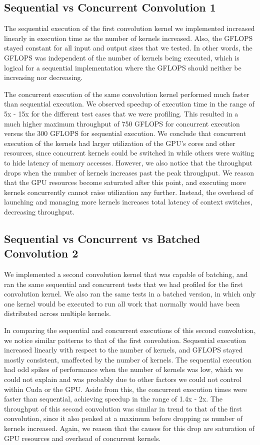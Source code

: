 \documentclass[sigconf]{acmart}
\begin{document}
\subsection{Sequential vs Concurrent Convolution 1}
The sequential execution of the first convolution kernel we implemented increased linearly in execution time as the number of kernels increased. Also, the GFLOPS stayed constant for all input and output sizes that we tested. In other words, the GFLOPS was independent of the number of kernels being executed, which is logical for a sequential implementation where the GFLOPS should neither be increasing nor decreasing. 

The concurrent execution of the same convolution kernel performed much faster than sequential execution. We observed speedup of execution time in the range of 5x - 15x for the different test cases that we were profiling. This resulted in a much higher maximum throughput of 750 GFLOPS for concurrent execution versus the 300 GFLOPS for sequential execution. We conclude that concurrent execution of the kernels had larger utilization of the GPU’s cores and other resources, since concurrent kernels could be switched in while others were waiting to hide latency of memory accesses. However, we also notice that the throughput drops when the number of kernels increases past the peak throughput. We reason that the GPU resources become saturated after this point, and executing more kernels concurrently cannot raise utilization any further. Instead, the overhead of launching and managing more kernels increases total latency of context switches, decreasing throughput.


\subsection{Sequential vs Concurrent vs Batched Convolution 2}

We implemented a second convolution kernel that was capable of batching, and ran the same sequential and concurrent tests that we had profiled for the first convolution kernel. We also ran the same tests in a batched version, in which only one kernel would be executed to run all work that normally would have been distributed across multiple kernels.

In comparing the sequential and concurrent executions of this second convolution, we notice similar patterns to that of the first convolution. Sequential execution increased linearly with respect to the number of kernels, and GFLOPS stayed mostly consistent, unaffected by the number of kernels. The sequential execution had odd spikes of performance when the number of kernels was low, which we could not explain and was probably due to other factors we could not control within Cuda or the GPU. Aside from this, the concurrent execution times were faster than sequential, achieving speedup in the range of 1.4x - 2x. The throughput of this second convolution was similar in trend to that of the first convolution, since it also peaked at a maximum before dropping as number of kernels increased. Again, we reason that the causes for this drop are saturation of GPU resources and overhead of concurrent kernels.
\end{document}
